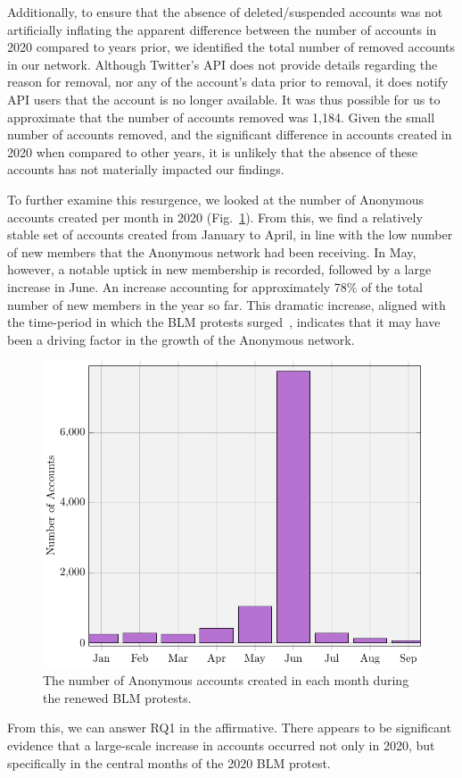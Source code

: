 \documentclass[letterpaper]{article}
\begin{document}
Additionally, to ensure that the absence of deleted/suspended accounts was not artificially inflating the apparent difference between the number of accounts in 2020 compared to years prior, we identified the total number of removed accounts in our network. Although Twitter's API does not provide details regarding the reason for removal, nor any of the account's data prior to removal, it does notify API users that the account is no longer available. It was thus possible for us to approximate that the number of accounts removed was 1,184. Given the small number of accounts removed, and the significant difference in accounts created in 2020 when compared to other years, it is unlikely that the absence of these accounts has not materially impacted our findings.

To further examine this resurgence, we looked at the number of Anonymous accounts created per month in 2020 (Fig.~\ref{fig:createDates2020}). From this, we find a relatively stable set of accounts created from January to April, in line with the low number of new members that the Anonymous network had been receiving. In May, however, a notable uptick in new membership is recorded, followed by a large increase in June. An increase accounting for approximately 78\% of the total number of new members in the year so far. This dramatic increase, aligned with the time-period in which the BLM protests surged~\cite{NYT2020}, indicates that it may have been a driving factor in the growth of the Anonymous network.

\begin{figure}[!ht]
\centering
\includegraphics[width=0.6\linewidth]{accounts_created_2020.pdf}
\caption{The number of Anonymous accounts created in each month during the renewed BLM protests.}
\label{fig:createDates2020}
\end{figure}

From this, we can answer RQ1 in the affirmative. There appears to be significant evidence that a large-scale increase in accounts occurred not only in 2020, but specifically in the central months of the 2020 BLM protest.
\end{document}
